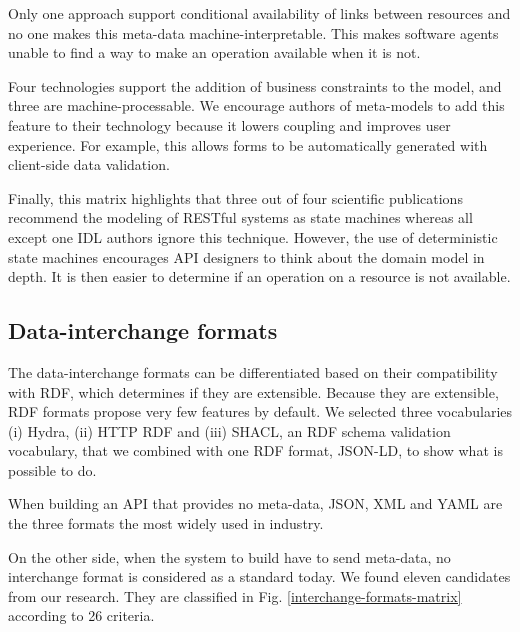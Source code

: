 Only one approach \cite{Schreier:2011:MRA:1967428.1967434} support conditional availability of links between resources and no one makes this meta-data machine-interpretable. This makes software agents unable to find a way to make an operation available when it is not.

Four technologies support the addition of business constraints to the model, and three are machine-processable. We encourage authors of meta-models to add this feature to their technology because it lowers coupling and improves user experience. For example, this allows forms to be automatically generated with client-side data validation.

Finally, this matrix highlights that three out of four scientific publications recommend the modeling of RESTful systems as state machines whereas all except one IDL authors ignore this technique. However, the use of deterministic state machines encourages API designers to think about the domain model in depth. It is then easier to determine if an operation on a resource is not available.

\subsection{Data-interchange formats}


The data-interchange formats can be differentiated based on their compatibility with RDF, which determines if they are extensible. Because they are extensible, RDF formats propose very few features by default. We selected three vocabularies (i) Hydra, (ii) HTTP RDF and (iii) SHACL, an RDF schema validation vocabulary, that we combined with one RDF format, JSON-LD, to show what is possible to do.

When building an API that provides no meta-data, JSON, XML and YAML are the three formats the most widely used in industry.

On the other side, when the system to build have to send meta-data, no interchange format is considered as a standard today. We found eleven candidates from our research. They are classified in Fig. \ref{interchange-formats-matrix} according to 26 criteria. %

